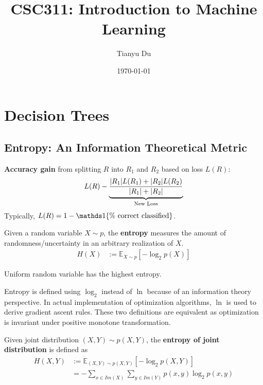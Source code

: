 \documentclass{article}
\title{CSC311: Introduction to Machine Learning}
\date{\today}
\author{Tianyu Du}
\begin{document}
	\maketitle
	\tableofcontents
	\newpage
	
	\section{Decision Trees}
	\subsection{Entropy: An Information Theoretical Metric}
	\begin{definition}
		\textbf{Accuracy gain} from splitting $R$ into $R_1$ and $R_2$ based on loss $L(R)$:
		\begin{align}
			L(R) - \underbrace{\frac{|R_1|L(R_1) + |R_2|L(R_2)}{|R_1| + |R_2|}}_{\text{{New Loss}}}
		\end{align}
		Typically, $L(R) = 1 - \id{\tx{\% correct classified}}$.
	\end{definition}
	
	\begin{definition}
		Given a random variable $X \sim p$, the \textbf{entropy} measures the amount of randomness/uncertainty in an arbitrary realization of $X$. 
		\begin{align}
			H(X) &:= \mathbb{E}_{X \sim p}[- \log_2 p(X)]
		\end{align}
	\end{definition}
	
	\begin{proposition}
		Uniform random variable has the highest entropy.
	\end{proposition}
	
	\begin{remark}
		Entropy is defined using $\log_2$ instead of $\ln$ because of an information theory perspective. In actual implementation of optimization algorithms, $\ln$ is used to derive gradient ascent rules. These two definitions are equivalent as optimization is invariant under positive monotone transformation.
	\end{remark}
	
	\begin{definition}
		Given joint distribution $(X, Y) \sim p(X, Y)$, the \textbf{entropy of joint distribution} is defined as
		\begin{align}
			H(X, Y) &:= \mathbb{E}_{(X, Y) \sim p(X, Y)} [
			- \log_2 p(X, Y)
			] \\
			&= - \sum_{x \in Im(X)} \sum_{y \in Im(Y)} p(x, y) \log_2 p(x, y)
		\end{align}
	\end{definition}
	
\end{document}
